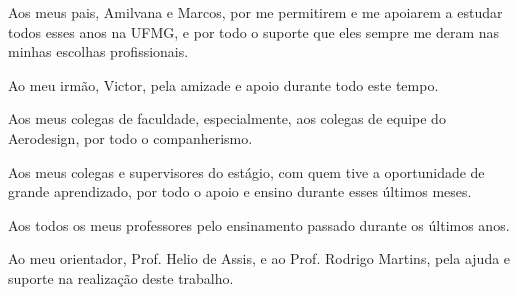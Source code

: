 \begin{agradecimentos}

Aos meus pais, Amilvana e Marcos, por me permitirem e me apoiarem a estudar todos esses anos na UFMG, e por todo o suporte que eles sempre me deram nas minhas escolhas profissionais.

Ao meu irmão, Victor, pela amizade e apoio durante todo este tempo.

Aos meus colegas de faculdade, especialmente, aos colegas de equipe do Aerodesign, por todo o companherismo.

Aos meus colegas e supervisores do estágio, com quem tive a oportunidade de grande aprendizado, por todo o apoio e ensino durante esses últimos meses.

Aos todos os meus professores pelo ensinamento passado durante os últimos anos.

Ao meu orientador, Prof. Helio de Assis, e ao Prof. Rodrigo Martins, pela ajuda e suporte na realização deste trabalho.

\end{agradecimentos}
